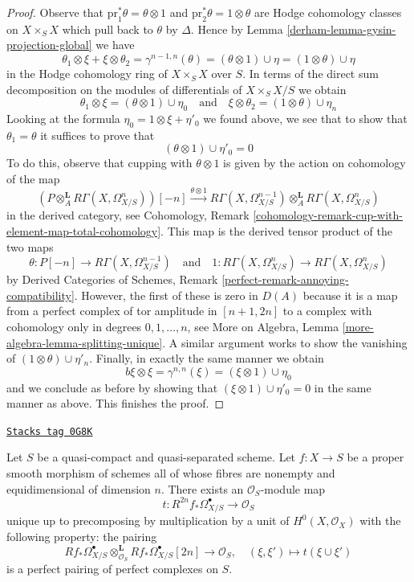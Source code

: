 \begin{proof}
\medskip\noindent
Observe that $\text{pr}_1^*\theta = \theta \otimes 1$
and $\text{pr}_2^*\theta = 1 \otimes \theta$ are
Hodge cohomology classes on
$X \times_S X$ which pull back to $\theta$ by $\Delta$.
Hence by Lemma \ref{derham-lemma-gysin-projection-global} we have
$$
\theta_1 \otimes \xi + \xi \otimes \theta_2 =
\gamma^{n - 1, n}(\theta) =
(\theta \otimes 1) \cup \eta =
(1 \otimes \theta) \cup \eta
$$
in the Hodge cohomology ring of $X \times_S X$ over $S$.
In terms of the direct sum decomposition on the modules
of differentials of $X \times_S X/S$ we obtain
$$
\theta_1 \otimes \xi =
(\theta \otimes 1) \cup \eta_0
\quad\text{and}\quad
\xi \otimes \theta_2 =
(1 \otimes \theta) \cup \eta_n
$$
Looking at the formula $\eta_0 = 1 \otimes \xi + \eta'_0$ we found above,
we see that to show that $\theta_1 = \theta$ it suffices to prove that
$$
(\theta \otimes 1) \cup \eta'_0 = 0
$$
To do this, observe that cupping with $\theta \otimes 1$ is given
by the action on cohomology of the map
$$
(P \otimes_A^\mathbf{L} R\Gamma(X, \Omega^n_{X/S}))[-n]
\xrightarrow{\theta \otimes 1}
R\Gamma(X, \Omega^{n - 1}_{X/S}) \otimes_A^\mathbf{L}
R\Gamma(X, \Omega^n_{X/S})
$$
in the derived category, see Cohomology, Remark
\ref{cohomology-remark-cup-with-element-map-total-cohomology}.
This map is the derived tensor product of the two maps
$$
\theta : P[-n] \to R\Gamma(X, \Omega^{n - 1}_{X/S})
\quad\text{and}\quad
1 : R\Gamma(X, \Omega^n_{X/S}) \to R\Gamma(X, \Omega^n_{X/S})
$$
by Derived Categories of Schemes, Remark
\ref{perfect-remark-annoying-compatibility}.
However, the first of these is zero in $D(A)$ because it is a map from
a perfect complex of tor amplitude in $[n + 1, 2n]$ to a complex
with cohomology only in degrees $0, 1, \ldots, n$, see
More on Algebra, Lemma \ref{more-algebra-lemma-splitting-unique}.
A similar argument works to show the vanishing of
$(1 \otimes \theta) \cup \eta'_n$. Finally,
in exactly the same manner we obtain
$$
b \xi \otimes \xi = \gamma^{n, n}(\xi) = (\xi \otimes 1) \cup \eta_0
$$
and we conclude as before by showing that
$(\xi \otimes 1) \cup \eta'_0 = 0$ in the same manner as above.
This finishes the proof.
\end{proof}

\begin{proposition}
\label{derham-proposition-relative-poincare-duality}
\href{https://stacks.math.columbia.edu/tag/0G8K}{\texttt{Stacks tag 0G8K}}

Let $S$ be a quasi-compact and quasi-separated scheme. Let $f : X \to S$
be a proper smooth morphism of schemes all of whose fibres are nonempty
and equidimensional of dimension $n$. There exists an
$\mathcal{O}_S$-module map
$$
t : R^{2n}f_*\Omega^\bullet_{X/S} \longrightarrow \mathcal{O}_S
$$
unique up to precomposing by multiplication by a unit of
$H^0(X, \mathcal{O}_X)$ with the following property: the pairing
$$
Rf_*\Omega^\bullet_{X/S}
\otimes_{\mathcal{O}_S}^\mathbf{L}
Rf_*\Omega^\bullet_{X/S}[2n]
\longrightarrow
\mathcal{O}_S, \quad
(\xi, \xi') \longmapsto t(\xi \cup \xi')
$$
is a perfect pairing of perfect complexes on $S$.
\end{proposition}

